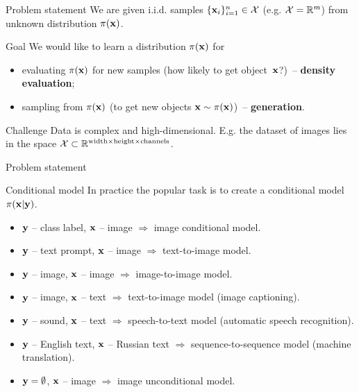 \begin{frame}{Problem statement}
	We are given i.i.d. samples $\{\mathbf{x}_i\}_{i=1}^n \in \mathcal{X}$ (e.g. $\mathcal{X} = \mathbb{R}^m$) from unknown distribution $\pi(\mathbf{x})$.
	
	\begin{block}{Goal}
		We would like to learn a distribution $\pi(\mathbf{x})$ for 
		\begin{itemize}
		    \item evaluating $\pi(\mathbf{x})$ for new samples (how likely to get object~$\mathbf{x}$?)~-- \textbf{density evaluation};
		    \item sampling from $\pi(\mathbf{x})$ (to get new objects $\mathbf{x} \sim \pi(\mathbf{x})$)~-- \textbf{generation}.
		\end{itemize}
	\end{block}
	\begin{block}{Challenge}
		 Data is complex and high-dimensional. E.g. the dataset of images lies in the space $\mathcal{X} \subset \mathbb{R}^{\text{width} \times \text{height} \times \text{channels}}$.
	\end{block}
\end{frame}
\begin{frame}{Problem statement}
	\begin{block}{Conditional model}
		In practice the popular task is to create a conditional model~$\pi(\mathbf{x} | \mathbf{y})$. 
		\begin{itemize}
		\item $\mathbf{y}$ -- class label, $\mathbf{x}$ -- image $\Rightarrow$ image conditional model.
		\item $\mathbf{y}$ -- text prompt, $\mathbf{x}$ -- image $\Rightarrow$ text-to-image model.
		\item $\mathbf{y}$ -- image, $\mathbf{x}$ -- image $\Rightarrow$ image-to-image model.
		\item $\mathbf{y}$ -- image, $\mathbf{x}$ -- text $\Rightarrow$ text-to-image model (image captioning).
		\item $\mathbf{y}$ -- sound, $\mathbf{x}$ -- text $\Rightarrow$ speech-to-text model (automatic speech recognition).
		\item $\mathbf{y}$ -- English text, $\mathbf{x}$ -- Russian text $\Rightarrow$ sequence-to-sequence model (machine translation).
		\item $\mathbf{y} = \emptyset$, $\mathbf{x}$ -- image $\Rightarrow$ image unconditional model.
		\end{itemize}
	\end{block}
\end{frame}
